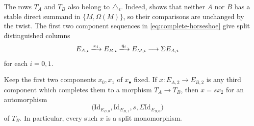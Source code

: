 \documentclass[a4paper,reqno,10pt]{amsart}
\numberwithin{equation}{section}
\newcommand{\eps}{\epsilon}
\begin{document}
The rows $T_A$ and $T_B$ also belong to $\triangle_\eps$. Indeed,
 shows that neither $A$ nor $B$ has a stable
direct summand in $\{M,\Omega(M)\}$, so their comparisons are unchanged by the
twist. The first two component sequences in \eqref{eq:complete-horseshoe}
give split distinguished columns
\[
 E_{A,i}\xlongrightarrow{x_i}E_{B,i}
 \xlongrightarrow{q_i}E_{M,i}\longrightarrow\Sigma E_{A,i}
\]
for each $i=0,1$.

\begin{lemma}\label{lem:relative-filler}
Keep the first two components $x_0,x_1$ of $x_\bullet$ fixed. If
$x:E_{A,2}\longrightarrow E_{B,2}$ is any third component which completes
them to a morphism $T_A\longrightarrow T_B$, then
$
 x=sx_2
$
for an automorphism
\[
 \bigl(\mathrm{Id}_{E_{B,0}},\mathrm{Id}_{E_{B,1}},s,
 \Sigma\mathrm{Id}_{E_{B,0}}\bigr)
\]
of $T_B$. In particular, every such $x$ is a split monomorphism.
\end{lemma}
\end{document}
